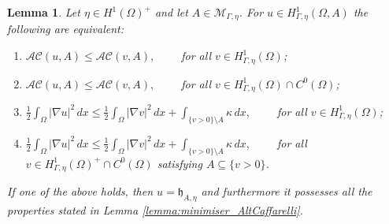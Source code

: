 \documentclass[10pt,a4paper]{amsart}
\newtheorem{lemma}{Lemma}
\begin{document}
\begin{lemma} \label{lemma:equivalent}
    Let $\eta\in H^1(\Omega)^+$ and let $A\in \mathcal M_{\Gamma,\eta}$. For $u \in H^1_{\Gamma,\eta}(\Omega,A)$ the following are equivalent:
    \begin{enumerate}
        \item $\mathcal{AC}(u,A)\le \mathcal{AC}(v,A),\qquad$ for all $v\in H^1_{\Gamma,\eta}(\Omega)$; \label{item:equiv1}
        \item $\mathcal{AC}(u,A)\le \mathcal{AC}(v,A),\qquad$ for all $v\in H^1_{\Gamma,\eta}(\Omega)\cap C^0(\Omega)$;\label{item:equiv2}

        \item $\displaystyle \frac 12\int_\Omega |\nabla u|^2 \, dx  \leq \frac 12\int_\Omega |\nabla v|^2 \, dx + \int_{\{v > 0\}\setminus A}\kappa\, dx,\qquad$ for all $v\in H^1_{\Gamma,\eta}(\Omega)$;\label{item:equiv3}
        \item $\displaystyle \frac 12\int_\Omega |\nabla u|^2 \, dx  \leq \frac 12\int_\Omega |\nabla v|^2 \, dx + \int_{\{v > 0\}\setminus A}\kappa\, dx,\qquad$ for all $v\in H^1_{\Gamma,\eta}(\Omega)^+\cap C^0(\Omega)$ satisfying $A\subseteq \{v>0\}$.\label{item:equiv4}
    \end{enumerate}
    If one of the above holds, then $u=\mathfrak{h}_{A,\eta}$ and furthermore it possesses all the properties stated in Lemma \ref{lemma:minimiser_AltCaffarelli}.
\end{lemma}
\end{document}
